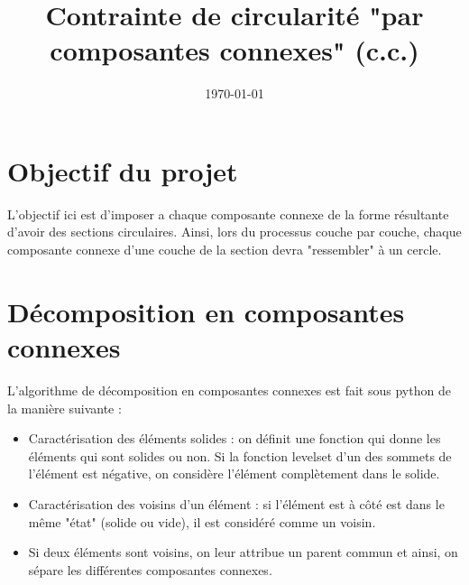 \documentclass[11pt,a4paper]{article}
\begin{document}
\newcommand{\intO}{\int_{\Omega}}
\newcommand{\intpO}{\int_{\partial\Omega}}
\newcommand{\bigintO}{\bigint_{\Omega}}
\newcommand{\bigintpO}{\bigint_{\partial\Omega}}

\newcommand{\intOi}[1]{\int_{\Omega_{#1}}}
\newcommand{\intpOi}[1]{\int_{\partial\Omega_{#1}}}
\newcommand{\bigintOi}[1]{\bigint_{\Omega_{#1}}}
\newcommand{\bigintpOi}[1]{\bigint_{\partial\Omega_{#1}}}

\newcommand{\dive}{\textrm{div}}
\newcommand{\acc}[1]{\left\{#1\right.}
\newcommand{\accTun}[1]{\left\{\begin{array}{l}#1\end{array}\right.}

\newcommand{\dist}{\textrm{dist}\,}
\newcommand{\tol}[1]{\textrm{tol}_{\textrm{#1}}}




\title{	Contrainte de circularité "par composantes connexes" (c.c.) }
\date{\today}

\maketitle


\section{Objectif du projet}

L'objectif ici est d'imposer a chaque composante connexe de la forme résultante d'avoir des sections circulaires. Ainsi, lors du processus couche par couche, chaque composante connexe d'une couche de la section devra "ressembler" à un cercle.

\section{Décomposition en composantes connexes}

L'algorithme de décomposition en composantes connexes est fait sous python de la manière suivante : 

\begin{itemize}
	\item Caractérisation des éléments solides : on définit une fonction qui donne les éléments qui sont solides ou non. Si la fonction levelset d'un des sommets de l'élément est négative, on considère l'élément complètement dans le solide.
	\item Caractérisation des voisins d'un élément : si l'élément est à côté est dans le même "état" (solide ou vide), il est considéré comme un voisin.
	\item Si deux éléments sont voisins, on leur attribue un parent commun et ainsi, on sépare les différentes composantes connexes.
\end{itemize}
\end{document}
